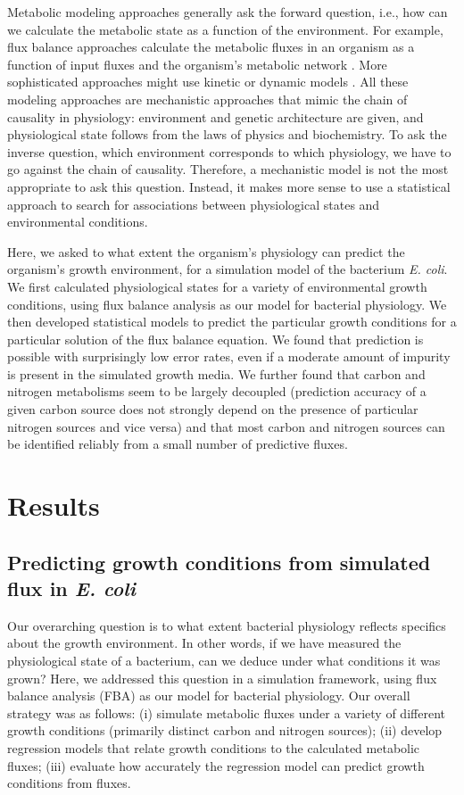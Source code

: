 \documentclass[12pt]{article}
\begin{document}
Metabolic modeling approaches generally ask the forward question, i.e., how can we calculate the metabolic state as a function of the environment. For example, flux balance approaches calculate the metabolic fluxes in an organism as a function of input fluxes and the organism's metabolic network \cite{Segreetal2002,Feistetal2007,SnitkinSegre2008,Orthetal2010}. More sophisticated approaches might use kinetic or dynamic models \cite{Covertetal2008,Adadietal2012}. All these modeling approaches are mechanistic approaches that mimic the chain of causality in physiology: environment and genetic architecture are given, and physiological state follows from the laws of physics and biochemistry. To ask the inverse question, which environment corresponds to which physiology, we have to go against the chain of causality. Therefore, a mechanistic model is not the most appropriate to ask this question. Instead, it makes more sense to use a statistical approach to search for associations between physiological states and environmental conditions.

Here, we asked to what extent the organism's physiology can predict the organism's growth environment, for a simulation model of the bacterium \emph{E. coli}. We first calculated physiological states for a variety of environmental growth conditions, using flux balance analysis as our model for bacterial physiology. We then developed statistical models to predict the particular growth conditions for a particular solution of the flux balance equation. We found that prediction is possible with surprisingly low error rates, even if a moderate amount of impurity is present in the simulated growth media. We further found that carbon and nitrogen metabolisms seem to be largely decoupled (prediction accuracy of a given carbon source does not strongly depend on the presence of particular nitrogen sources and vice versa) and that most carbon and nitrogen sources can be identified reliably from a small number of predictive fluxes.

\section{Results}

\subsection{Predicting growth conditions from simulated flux in \emph{E. coli}}

Our overarching question is to what extent bacterial physiology reflects specifics about the growth environment. In other words, if we have measured the physiological state of a bacterium, can we deduce under what conditions it was grown? Here, we addressed this question in a simulation framework, using flux balance analysis (FBA) as our model for bacterial physiology. Our overall strategy was as follows: (i) simulate metabolic fluxes under a variety of different growth conditions (primarily distinct carbon and nitrogen sources); (ii) develop regression models that relate growth conditions to the calculated metabolic fluxes; (iii) evaluate how accurately the regression model can predict growth conditions from fluxes.
\end{document}
